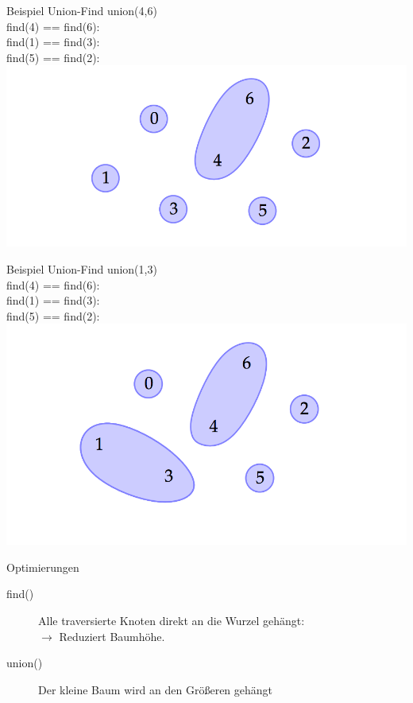 \begin{frame}{Beispiel Union-Find}
	union(4,6) \\
	\color{black}find(4) == find(6): \color{OliveGreen}{true} \\
	\color{black}find(1) == find(3): \color{red}{false} \\
	\color{black}find(5) == find(2): \color{red}{false} \\
	\includegraphics[width=\textwidth]{images/uf02}
	
\end{frame}

\begin{frame}{Beispiel Union-Find}
	union(1,3) \\
	\color{black}find(4) == find(6): \color{OliveGreen}{true} \\
	\color{black}find(1) == find(3): \color{OliveGreen}{true} \\
	\color{black}find(5) == find(2): \color{red}{false} \\
	
	\includegraphics[width=\textwidth]{images/uf03}
	
\end{frame}

\begin{frame}{Optimierungen}
	\begin{description}
	\item[find()] Alle traversierte Knoten direkt an die Wurzel gehängt: \\
		$\rightarrow$ Reduziert Baumhöhe. 

	\item[union()] Der kleine Baum wird an den Größeren gehängt
	\end{description}	

\end{frame}

